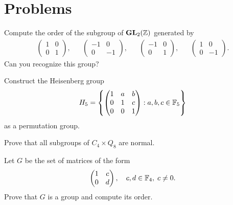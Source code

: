 



\section{Problems}


\begin{prob}
Compute the order of the subgroup of $\mathbf{GL}_2(\mathbb{Z})$ generated by
\begin{align*}
    \begin{pmatrix}
        1 & 0\\
        0 & 1
    \end{pmatrix},
    &&
    \begin{pmatrix}
        -1 & 0\\
        0 & -1
    \end{pmatrix},
    &&
    \begin{pmatrix}
        -1 & 0\\
        0 & 1
    \end{pmatrix},
    &&
    \begin{pmatrix}
        1 & 0\\
        0 & -1
    \end{pmatrix}.
\end{align*}
Can you recognize this group?
\end{prob}

\begin{prob}
  Construct the Heisenberg group 
  \[
H_5=\left\{\begin{pmatrix}
    1 & a & b\\
    0 & 1 & c\\
    0 & 0 & 1
    \end{pmatrix}:a,b,c\in\mathbb{F}_5\right\}
\]
as a permutation group. 
\end{prob}

\begin{prob}
    Prove that all subgroups of $C_4\times Q_8$ are normal.
\end{prob}

\begin{prob}
    Let $G$ be the set of matrices of the form
    \[
        \begin{pmatrix}
            1&c\\
            0&d
        \end{pmatrix},
        \quad
        c,d\in\mathbb{F}_4,\;c\ne0.
    \]
    Prove that $G$ is a group and compute its order. 
\end{prob}

